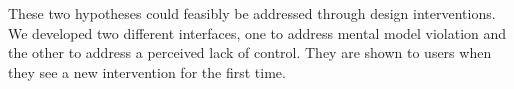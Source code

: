 
These two hypotheses could feasibly be addressed through design interventions.   We developed two different interfaces, one to address mental model violation and the other to address a perceived lack of control. They are shown to users when they see a new intervention for the first time.

